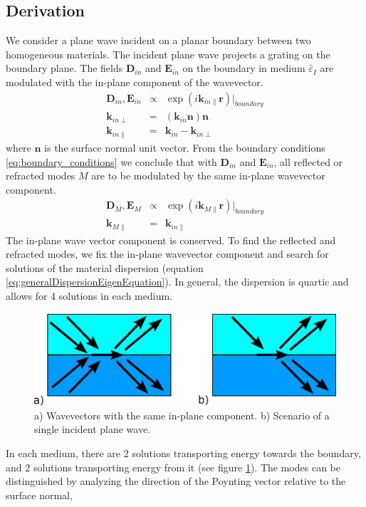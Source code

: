 \documentclass[12pt,a4paper,twoside,openright,BCOR10mm,headsepline,titlepage,abstracton,chapterprefix,final]{scrreprt}
\newcommand\Vector[1]{{\mathbf{#1}}}
\newcommand\Location{\Vector{r}}
\newcommand\wavenumber{k}
\newcommand\Wavevector{\Vector{\wavenumber}}
\newcommand\Tensor[1]{\hat{#1}}
\newcommand\scalarEfield{E}
\newcommand\scalarDfield{D}
\newcommand\Efield{\Vector{\scalarEfield}}
\newcommand\Dfield{\Vector{\scalarDfield}}
\newcommand\permittivity{\Tensor{\scalarpermittivity}}
\newcommand\scalarpermittivity{\varepsilon}
\newcommand\materialone{I}
\begin{document}
\subsection{Derivation}
We consider a plane wave incident on a planar boundary between two homogeneous materials.
The incident plane wave projects a grating on the boundary plane. 
The fields $\Dfield_{in}$ and $\Efield_{in}$ on the boundary in medium $\permittivity_\materialone$ are modulated with the in-plane component of the wavevector. 
\begin{eqnarray}
 \Dfield_{in}, \Efield_{in} &\propto& \exp( i \Wavevector_{in\parallel} \Location)|_{boundary} \\
 \Wavevector_{in\perp} &=& ( \Wavevector_{in} \Vector{n} ) \Vector{n} \\
 \Wavevector_{in\parallel} &=& \Wavevector_{in} - \Wavevector_{in\perp}
\end{eqnarray}
where $\Vector{n}$ is the surface normal unit vector.
From the boundary conditions \ref{eq:boundary_conditions} we conclude that with $\Dfield_{in}$ and $\Efield_{in}$, 
all reflected or refracted modes $M$ are to be modulated by the same in-plane wavevector component.
\begin{eqnarray}
  \Dfield_{M}, \Efield_{M} &\propto& \exp( i \Wavevector_{M\parallel} \Location)|_{boundary} \\
  \Wavevector_{M\parallel} &=& \Wavevector_{in\parallel}
\end{eqnarray}
The in-plane wave vector component is conserved.
To find the reflected and refracted modes, 
we fix the in-plane wavevector component and search for solutions of the material dispersion
(equation \ref{eq:generalDispersionEigenEquation}).
In general, the dispersion is quartic and allows for 4 solutions in each medium.
\begin{figure}
  \centering
   \includegraphics[width=0.5\columnwidth]{boundary_wavevectors}
  \caption{a) Wavevectors with the same in-plane component.
           b) Scenario of a single incident plane wave.}
  \label{fig:boundary_wavevectors}
\end{figure}
In each medium, there are 2 solutions transporting energy towards the boundary, 
and 2 solutions transporting energy from it (see figure \ref{fig:boundary_wavevectors}).
The modes can be distinguished by analyzing the direction of the Poynting vector relative to the surface normal,
\end{document}
